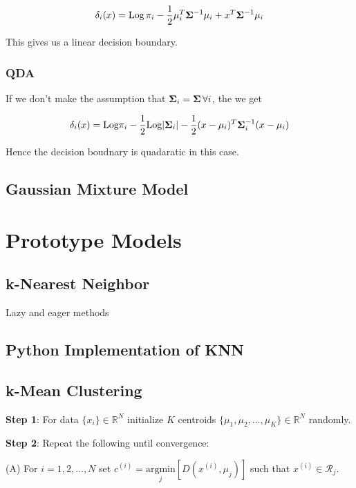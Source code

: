 \documentclass[11pt]{article}
\theoremstyle{definition}
\begin{document}
$$
\delta_i(x) = \text{Log}\, \pi_i - \frac{1}{2}\mu_i^T{\bf{\Sigma}}^{-1}\mu_i + x^T{\bf{\Sigma}}^{-1}\mu_i
$$

This gives us a linear decision boundary. 



\subsubsection{QDA}

If we don't make the assumption that ${\bf{\Sigma}}_i = {\bf{\Sigma}} \, \forall i$, the we get 

$$
\delta_i(x) = \text{Log}\pi_i -\frac12 \text{Log} |{\bf{\Sigma}}_i| - \frac12 (x-\mu_i)^T {\bf{\Sigma}}_i^{-1} (x-\mu_i) 
$$

Hence the decision boudnary is quadaratic in this case. 





\subsection{Gaussian Mixture Model }



\newpage
\section{Prototype Models}

\subsection{k-Nearest Neighbor}


Lazy and eager methods 

\subsection{Python Implementation of KNN}


\subsection{k-Mean Clustering }

{\bf{Step 1}}: For data $\{x_i\} \in \mathbb{R}^N$ initialize $K$ centroids $\{\mu_1, \mu_2, ..., \mu_K\} \in \mathbb{R}^N$ randomly. 

{\bf{Step 2}}: Repeat the following until convergence:

\quad		(A) For $i = 1, 2, ..., N$ set $c^{(i)} = \underset{j}{\mathrm{argmin}} \left[D(x^{(i)}, \mu_j)\right]$ such that $x^{(i)}\in \mathcal{R}_j$. 
\end{document}
